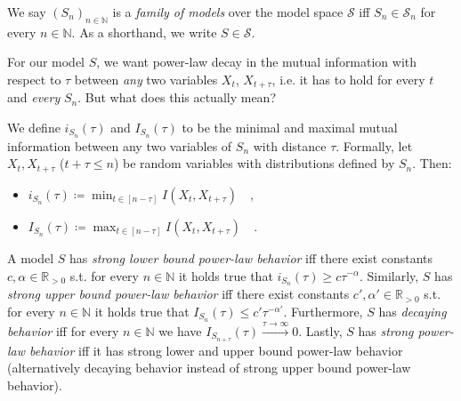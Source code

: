 \documentclass[../../main.tex]{subfiles}
\begin{document}
    \begin{definition}
        We say $(S_n)_{n \in \mathbb{N}}$ is a \emph{family of models} over the model space $\mathcal{S}$ iff $S_n \in \mathcal{S}_n$ for every $n \in \mathbb{N}$. As a shorthand, we write $S \in \mathcal{S}$.
    \end{definition}

    For our model $S$, we want power-law decay in the mutual information with respect to $\tau$ between \emph{any} two variables $X_t$, $X_{t + \tau}$, i.e. it has to hold for every $t$ and \emph{every} $S_n$. But what does this actually mean?

    \begin{definition}
        We define $i_{S_n}(\tau)$ and $I_{S_n}(\tau)$ to be the minimal and maximal mutual information between any two variables of $S_n$ with distance $\tau$. Formally, let $X_t, X_{t + \tau}$ ($t + \tau \leq n$) be random variables with distributions defined by $S_n$. Then:
        \vspace{-1em}
        \begin{itemize}
            \item $i_{S_n}(\tau) \coloneqq \min_{t \in [n - \tau]} I(X_t, X_{t + \tau}) \quad ,$
            \item $I_{S_n}(\tau) \coloneqq \max_{t \in [n - \tau]} I(X_t, X_{t + \tau}) \quad .$
        \end{itemize}
    \end{definition}

    \begin{definition}
        \label{definition:strong_model_power_law_behavior}
        A model $S$ has \emph{strong lower bound power-law behavior} iff there exist constants $c, \alpha \in \mathbb{R}_{>0}$ s.t. for every $n \in \mathbb{N}$ it holds true that $i_{S_n}(\tau) \geq c \tau^{-\alpha}$. Similarly, $S$ has \emph{strong upper bound power-law behavior} iff there exist constants $c', \alpha' \in \mathbb{R}_{>0}$ s.t. for every $n \in \mathbb{N}$ it holds true that $I_{S_n}(\tau) \leq c' \tau^{-\alpha'}$. Furthermore, $S$ has \emph{decaying behavior} iff for every $n \in \mathbb{N}$ we have $I_{S_{n + \tau}}(\tau) \xrightarrow{\tau \to \infty} 0$. Lastly, $S$ has \emph{strong power-law behavior} iff it has strong lower and upper bound power-law behavior (alternatively decaying behavior instead of strong upper bound power-law behavior).
    \end{definition}
\end{document}
